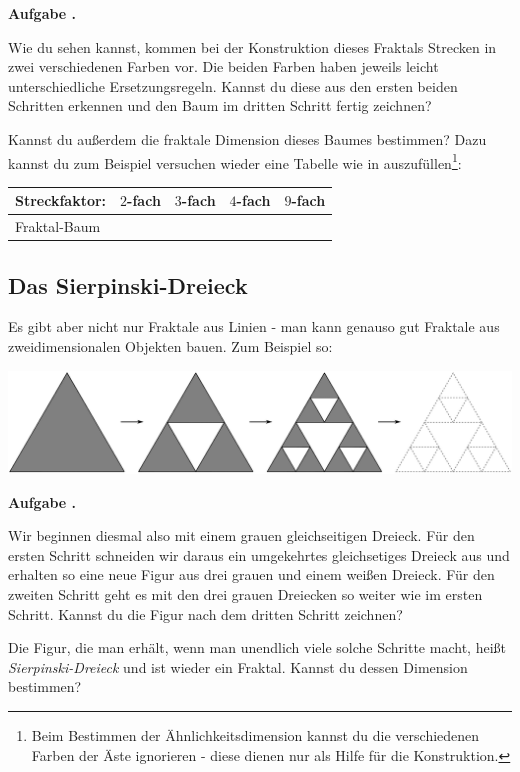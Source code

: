 \documentclass[a4paper,ngerman,12pt]{scrartcl}
\theoremstyle{definition}
\theoremstyle{plain}
\theoremstyle{remark}
\newlength{\aufgabenskip}
\newcounter{aufgabennummer}
\newenvironment{aufgabe}[1]{
  \addtocounter{aufgabennummer}{1}
  \textbf{Aufgabe \theaufgabennummer.} \emph{#1} \par
}{\vspace{\aufgabenskip}}
\begin{document}
\begin{aufgabe}{}
	Wie du sehen kannst, kommen bei der Konstruktion dieses Fraktals Strecken in zwei verschiedenen Farben vor. Die beiden Farben haben jeweils leicht unterschiedliche Ersetzungsregeln. Kannst du diese aus den ersten beiden Schritten erkennen und den Baum im dritten Schritt fertig zeichnen? 
	
	Kannst du außerdem die fraktale Dimension dieses Baumes bestimmen? Dazu kannst du zum Beispiel versuchen wieder eine Tabelle wie in  auszufüllen\footnote{Beim Bestimmen der Ähnlichkeitsdimension kannst du die verschiedenen Farben der Äste ignorieren - diese dienen nur als Hilfe für die Konstruktion.}:
	\begin{center}
		\renewcommand{\arraystretch}{2}
		\begin{tabular}{l||c|c|c|c}
			Streckfaktor:& $2$-fach & $3$-fach & $4$-fach & $9$-fach \\\hline\hline
			Fraktal-Baum & 	&   &          &			 \\	
		\end{tabular}
	\end{center}
\end{aufgabe}


\subsection{Das Sierpinski-Dreieck}

Es gibt aber nicht nur Fraktale aus Linien - man kann genauso gut Fraktale aus zweidimensionalen Objekten bauen. Zum Beispiel so:
\begin{center}
	\includegraphics[width=.7\textwidth]{Bilder/Sierpinski-Konstruktion.pdf}
\end{center}

\begin{aufgabe}{}\label{aufgabe:Sierpinski-Flaeche}
	Wir beginnen diesmal also mit einem grauen gleichseitigen Dreieck. Für den ersten Schritt schneiden wir daraus ein umgekehrtes gleichsetiges Dreieck aus und erhalten so eine neue Figur aus drei grauen und einem weißen Dreieck. Für den zweiten Schritt geht es mit den drei grauen Dreiecken so weiter wie im ersten Schritt. Kannst du die Figur nach dem dritten Schritt zeichnen?
	
	Die Figur, die man erhält, wenn man unendlich viele solche Schritte macht, heißt \emph{Sierpinski-Dreieck} und ist wieder ein Fraktal. Kannst du dessen Dimension bestimmen?
\end{aufgabe}
\end{document}

